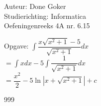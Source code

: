 \documentclass[a4paper]{article}
\begin{document}
  
\noindent \large Auteur: Done Goker \\
\noindent \large Studierichting: Informatica\\
\noindent \large Oefeningenreeks 4A nr. 6.15\\

\medskip

\normalsize

Opgave:
$\displaystyle\int \dfrac{x \sqrt{x^2 + 1} -5}{\sqrt{x^2 + 1}} dx$ \\

$= \displaystyle\int x dx - 5\displaystyle\int \dfrac{1}{\sqrt{x^2 + 1}} dx$ \\

$= \dfrac{x^2}{2} -5\ln|x + \sqrt{x^2 + 1}| + c$ \\

\begin{thebibliography}{999}
\end{thebibliography}
\end{document}
